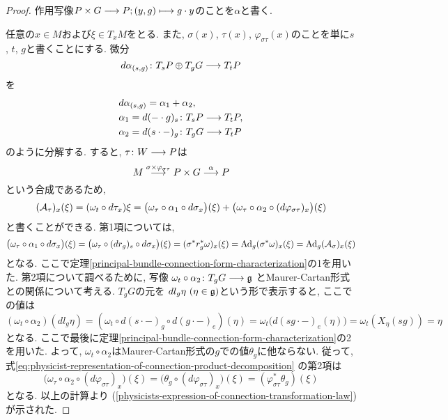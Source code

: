 \begin{proof}
作用写像$P \times G \longrightarrow P; (y, g) \longmapsto g \cdot y$のことを$\alpha$と書く.

任意の$x \in M$および$\xi \in T_xM$をとる.
また, $\sigma(x)$, $\tau(x)$, $\varphi_{\sigma\tau}(x)$のことを単に$s$, $t$, $g$と書くことにする.
微分
\begin{equation}
d\alpha_{(s, g)} \colon T_sP \oplus T_gG \longrightarrow T_tP
\end{equation}
を
\begin{align}
  &d\alpha_{(s, g)} = \alpha_1 + \alpha_2, \\
  &\alpha_1 = d(- \cdot g)_s \colon T_sP \longrightarrow T_tP, \\
  &\alpha_2 = d(s \cdot -)_g \colon T_gG \longrightarrow T_tP
\end{align}
のように分解する.
すると,
$\tau \colon W \longrightarrow P$は
\begin{equation}
M \stackrel{\sigma \times \varphi_{\sigma\tau}}{\longrightarrow} P \times G \stackrel{\alpha}{\longrightarrow} P
\end{equation}
という合成であるため,
\begin{equation}
\label{eq:physicist-representation-of-connection-product-decomposition}
(\mathcal{A}_\tau)_x(\xi) =
(\omega_{t} \circ d\tau_x) \xi =
\bigl(\omega_{\tau} \circ \alpha_1 \circ d\sigma_x\bigr) (\xi) +
\bigl(\omega_{\tau} \circ \alpha_2 \circ (d\varphi_{\sigma\tau})_x \bigr) (\xi)
\end{equation}
と書くことができる.
第1項については,
\begin{equation}
\bigl(\omega_\tau \circ \alpha_1 \circ d\sigma_x\bigr) (\xi) =
\bigl(\omega_\tau \circ (dr_g)_s \circ d\sigma_x\bigr) (\xi) =
(\sigma^* r_g^* \omega)_x (\xi) =
\operatorname{Ad}_g (\sigma^* \omega)_x (\xi) =
\operatorname{Ad}_g (\mathcal{A}_\sigma)_x (\xi)
\end{equation}
となる.
ここで定理\ref{principal-bundle-connection-form-characterization}の1を用いた.
第2項について調べるために,
写像
$\omega_t \circ \alpha_2 \colon T_gG \longrightarrow \mathfrak{g}$
とMaurer-Cartan形式との関係について考える.
$T_gG$の元を
$dl_g\eta \ (\eta \in \mathfrak{g})$という形で表示すると,
ここでの値は
\begin{equation}
(\omega_t \circ \alpha_2) (dl_g \eta) =
(\omega_t \circ d(s \cdot -)_g \circ d(g \cdot -)_e) (\eta) =
\omega_t \bigl( d(sg \cdot -)_e (\eta) \bigr) =
\omega_t (X_\eta (sg))
= \eta
\end{equation}
となる.
ここで最後に定理\ref{principal-bundle-connection-form-characterization}の2を用いた.
よって, $\omega_t \circ \alpha_2$はMaurer-Cartan形式の$g$での値$\theta_g$に他ならない.
従って,
式\ref{eq:physicist-representation-of-connection-product-decomposition}
の第2項は
\begin{equation}
\bigl(\omega_{\tau} \circ \alpha_2 \circ (d\varphi_{\sigma\tau})_x \bigr) (\xi) =
\bigl(\theta_g \circ (d\varphi_{\sigma\tau})_x\bigr) (\xi) =
(\varphi_{\sigma\tau}^* \theta_g) (\xi)
\end{equation}
となる.
以上の計算より
(\ref{physicists-expression-of-connection-transformation-law})が示された.
\end{proof}

